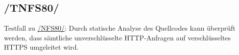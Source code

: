 \subsection*{/TNFS80/}

\label{/TNFS80/} Testfall zu \hyperref[/NFS80/]{/NFS80/}: Durch \gls{statische Analyse} des \Gls{Quellcode}s kann überprüft werden, dass sämtliche unverschlüsselte \Gls{HTTP}-Anfragen auf verschlüsseltes \Gls{HTTPS} umgeleitet wird.